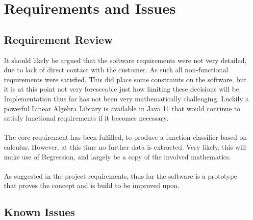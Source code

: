 \documentclass[main.tex]{subfiles}
\begin{document}
  
  \section{Requirements and Issues}
    
    \subsection{Requirement Review}
      
      It should likely be argued that the software requirements were not very detailed, due to lack of direct contact with the customer. As such all non-functional requirements were satisfied. This did place some constraints on the software, but it is at this point not very foreseeable just how limiting these decisions will be. Implementation thus far has not been very mathematically challenging. Luckily a powerful Linear Algebra Library is available in Java 11 \cite{} that would continue to satisfy functional requirements if it becomes necessary.
      \\\\
      The core requirement has been fulfilled, to produce a function classifier based on calculus. However, at this time no further data is extracted. Very likely, this will make use of Regression, and largely be a copy of the involved mathematics.
      \\\\
      As suggested in the project requirements, thus far the software is a prototype that proves the concept and is build to be improved upon.
      
    \subsection{Known Issues}
      
\end{document}
